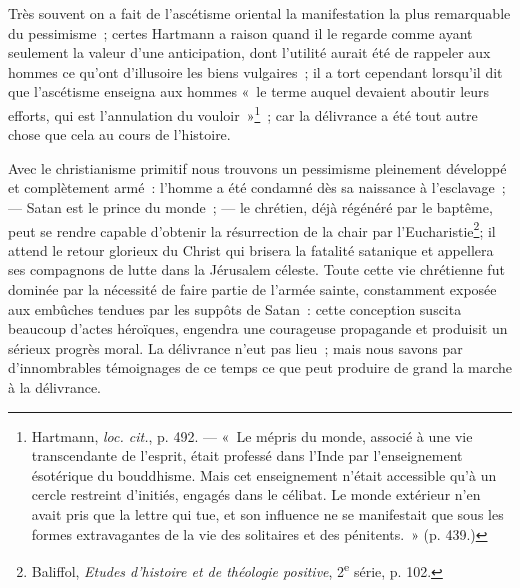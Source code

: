 \documentclass[french,twoside]{book} %
\begin{document}
Très souvent on a fait de l’ascétisme oriental la manifestation la plus remarquable du pessimisme ; certes Hartmann a raison quand il le regarde comme ayant seulement la valeur d’une anticipation, dont l’utilité aurait été de rappeler aux hommes ce qu’ont d’illusoire les biens vulgaires ; il a tort cependant lorsqu’il dit que l’ascétisme enseigna aux hommes « le terme auquel devaient aboutir leurs efforts, qui est l’annulation du  vouloir »\footnote{ \noindent Hartmann, \emph{loc. cit.}, p. 492. — « Le mépris du monde, associé à une vie transcendante de l’esprit, était professé dans l’Inde par l’enseignement ésotérique du bouddhisme. Mais cet enseignement n’était accessible qu’à un cercle restreint d’initiés, engagés dans le célibat. Le monde extérieur n’en avait pris que la lettre qui tue, et son influence ne se manifestait que sous les formes extravagantes de la vie des solitaires et des pénitents. » (p. 439.)
 } ; car la délivrance a été tout autre chose que cela au cours de l’histoire.\par
Avec le christianisme primitif nous trouvons un pessimisme pleinement développé et complètement armé : l’homme a été condamné dès sa naissance à l’esclavage ; — Satan est le prince du monde ; — le chrétien, déjà régénéré par le baptême, peut se rendre capable d’obtenir la résurrection de la chair par l’Eucharistie\footnote{ \noindent Baliffol, \emph{Etudes d’histoire et de théologie positive}, 2\textsuperscript{e} série, p. 102.
 }; il attend le retour glorieux du Christ qui brisera la fatalité satanique et appellera ses compagnons de lutte dans la Jérusalem céleste. Toute cette vie chrétienne fut dominée par la nécessité de faire partie de l’armée sainte, constamment exposée aux embûches tendues par les suppôts de Satan : cette conception suscita beaucoup d’actes héroïques, engendra une courageuse propagande et produisit un sérieux progrès moral. La délivrance n’eut pas lieu ; mais nous savons par d’innombrables témoignages de ce temps ce que peut produire de grand la marche à la délivrance.\par
\end{document}
